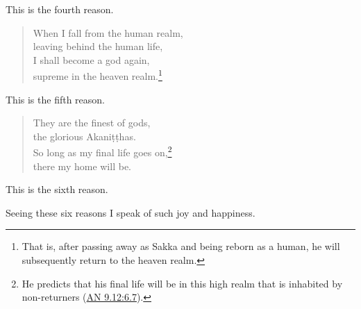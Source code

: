 \documentclass[12pt,openany]{book}%
\begin{document}
This is the fourth reason. 

\begin{verse}%
When I fall from the human realm, \\
leaving behind the human life, \\
I shall become a god again, \\
supreme in the heaven realm.\footnote{That is, after passing away as Sakka and being reborn as a human, he will subsequently return to the heaven realm. } 

%
\end{verse}

This is the fifth reason. 

\begin{verse}%
They are the finest of gods, \\
the glorious \textsanskrit{Akaniṭṭhas}. \\
So long as my final life goes on,\footnote{He predicts that his final life will be in this high realm that is inhabited by non-returners (\href{https://suttacentral.net/an9.12/en/sujato\#6.7}{AN 9.12:6.7}). } \\
there my home will be. 

%
\end{verse}

This is the sixth reason. 

Seeing these six reasons I speak of such joy and happiness. 
\end{document}
